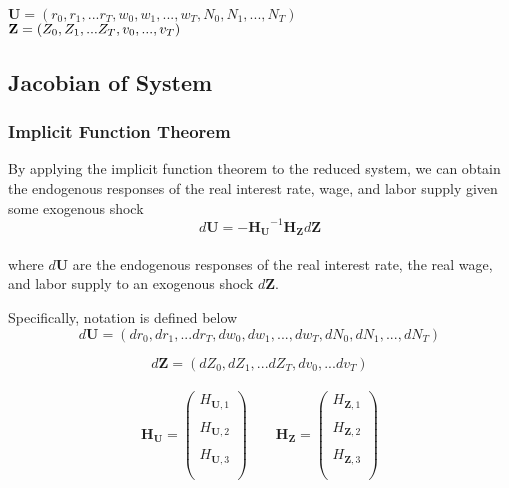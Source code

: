 \documentclass[titlepage]{\econtex}\providecommand{\texname}{FBS-NK}
\begin{document}
$\mathbf{U} = (r_{0} , r_{1} , ...r_{T}, w_{0}, w_{1}, ..., w_{T}, N_{0}, N_{1},...,N_{T})$ \\ 

$ \mathbf{Z} = ( Z_{0}, Z_{1},... Z_{T}, v_{0},...,v_{T}) \\ \\ $ 




\hypertarget{Jacobian of System}{}
\subsection{Jacobian of System} 

\hypertarget{Implicit Function Theorem}{}
\subsubsection{Implicit Function Theorem} 

By applying the implicit function theorem to the reduced system, we can obtain the endogenous responses of the real interest rate, wage, and labor supply given some exogenous shock \\

$$d\mathbf{U} =  -{\mathbf{H}_{\mathbf{U}}}^{-1} \mathbf{H}_{\mathbf{Z}} d \mathbf{Z}$$ \\ 

where $d\mathbf{U}$ are the endogenous responses of the real interest rate, the real wage, and labor supply to an exogenous shock $d \mathbf{Z}$.

Specifically, notation is defined below\\


$$d\mathbf{U} =(dr_{0} , dr_{1} , ...dr_{T}, dw_{0}, dw_{1}, ..., dw_{T}, dN_{0}, dN_{1},...,dN_{T})$$

$$d \mathbf{Z} = ( dZ_{0}, dZ_{1},... dZ_{T}, dv_{0},...dv_{T}) $$ \\





 $$  \mathbf{H}_{\mathbf{U}}= \begin{pmatrix} 
H_{\mathbf{U}, 1} \\ \\ 
H_{\mathbf{U}, 2}  \\ \\
H_{\mathbf{U}, 3} \\ \\
 \end{pmatrix} \quad \quad \mathbf{H}_{\mathbf{Z}}= \begin{pmatrix} 
H_{\mathbf{Z}, 1} \\ \\ 
H_{\mathbf{Z}, 2}  \\ \\
H_{\mathbf{Z}, 3} \\ \\
 \end{pmatrix}$$ \\ \\
 
\end{document}
